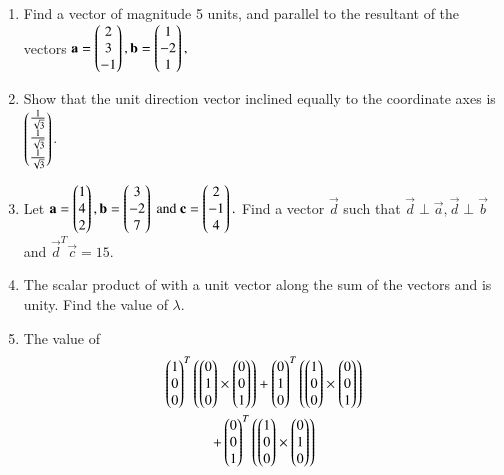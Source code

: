 \begin{enumerate}[label=\arabic*.,ref=\thesubsection.\theenumi]
\item Find a vector of magnitude 5 units, and parallel to the resultant of the vectors 
$
\mathbf{a}=\begin{pmatrix}2\\3\\-1\end{pmatrix},
\mathbf{b}=\begin{pmatrix}1\\-2\\1\end{pmatrix},
$
\\
\solution 

\item Show that the unit direction vector inclined equally to the coordinate axes is $\begin{pmatrix}\frac{1}{\sqrt{3}}\\\frac{1}{\sqrt{3}}\\ \frac{1}{\sqrt{3}}\end{pmatrix}$.
\item Let 
$
\mathbf{a}=\begin{pmatrix}1\\4\\2\end{pmatrix},
\mathbf{b}=\begin{pmatrix}3\\-2\\7\end{pmatrix} \text{ and }
\mathbf{c}=\begin{pmatrix}2\\-1\\4\end{pmatrix}.
$
Find a vector $\vec{d}$ such that $\vec{d}\perp\vec{a},\vec{d}\perp\vec{b}$ and $\vec{d}^T\vec{c} = 15$.
\\
\solution 

\item The scalar product of  with a unit vector along the sum  of the vectors  and  is unity.  Find the value of $\lambda$.
\item The value of 
\begin{multline}
\myvec{1\\0\\0}^T\brak{\myvec{0\\1\\0}\times \myvec{0\\0\\1}}
+\myvec{0\\1\\0}^T\brak{\myvec{1\\0\\0}\times \myvec{0\\0\\1}}
\\
+\myvec{0\\0\\1}^T\brak{\myvec{1\\0\\0}\times \myvec{0\\1\\0}}

\end{multline}
\end{enumerate}
